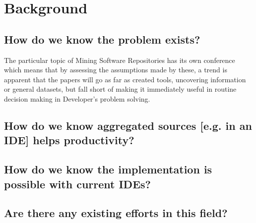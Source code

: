 \chapter{Background}
\section{How do we know the problem exists?}

The particular topic of Mining Software Repositories has its own conference \parencite{Storey:2019:3341883} which means that by assessing the assumptions made by these, a trend is apparent that the papers will go as far as created tools, uncovering information or general datasets, but fall short of making it immediately useful in routine decision making in Developer's problem solving.

\section{How do we know aggregated sources [e.g. in an IDE] helps productivity?}
\section{How do we know the implementation is possible with current IDEs?}
\section{Are there any existing efforts in this field?}
